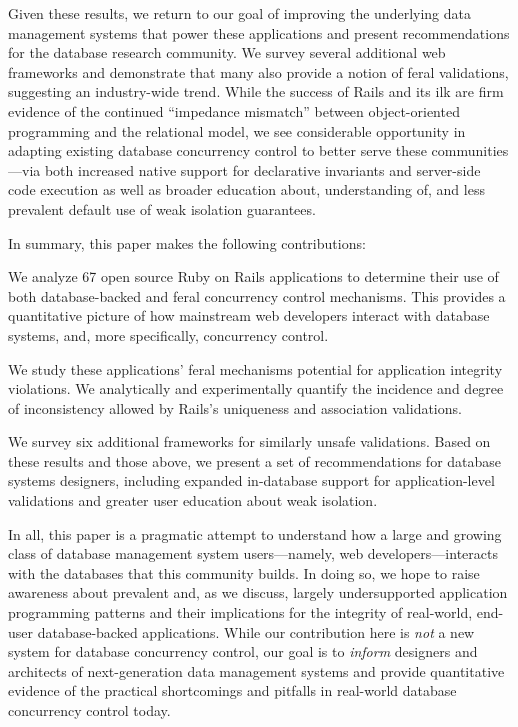 Given these results, we return to our goal of improving the underlying
data management systems that power these applications and present
recommendations for the database research community. We survey several
additional web frameworks and demonstrate that many also provide a
notion of feral validations, suggesting an industry-wide trend. While
the success of Rails and its ilk are firm evidence of the continued
``impedance mismatch'' between object-oriented programming and the
relational model, we see considerable opportunity in adapting existing
database concurrency control to better serve these communities---via
both increased native support for declarative invariants and
server-side code execution as well as broader education about,
understanding of, and less prevalent default use of weak isolation
guarantees.

In summary, this paper makes the following contributions:
\begin{myitemize}
\item We analyze 67 open source Ruby on Rails applications to
  determine their use of both database-backed and feral concurrency
  control mechanisms. This provides a quantitative picture of how
  mainstream web developers interact with database systems, and, more
  specifically, concurrency control.

\item We study these applications' feral mechanisms potential for
  application integrity violations. We analytically and experimentally
  quantify the incidence and degree of inconsistency allowed by
  Rails's uniqueness and association validations.

\item We survey six additional frameworks for similarly unsafe
  validations. Based on these results and those above, we present a
  set of recommendations for database systems designers, including
  expanded in-database support for application-level validations and
  greater user education about weak isolation.
\end{myitemize}

In all, this paper is a pragmatic attempt to understand how a large
and growing class of database management system users---namely, web
developers---interacts with the databases that this community
builds. In doing so, we hope to raise awareness about prevalent and,
as we discuss, largely undersupported application programming patterns
and their implications for the integrity of real-world, end-user
database-backed applications. While our contribution here is
\textit{not} a new system for database concurrency control, our goal
is to \textit{inform} designers and architects of next-generation data
management systems and provide quantitative evidence of the practical
shortcomings and pitfalls in real-world database concurrency control
today.

